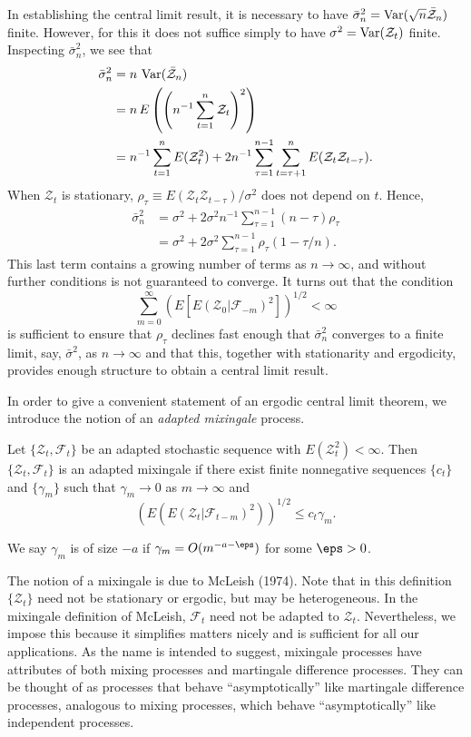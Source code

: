 In establishing the central limit result, it is necessary to have $\bar{\sigma}_n^2 = \operatorname{Var}(\sqrt{n}\bar{\mathcal{Z}}_n)$ finite. However, for this it does not suffice simply to have $\sigma^2 = \operatorname{Var}(\mathcal{Z}_t)$ finite. Inspecting $\bar{\sigma}_n^2$, we see that
\begin{align*}
\bar{\sigma}_n^2 &= n\,\operatorname{Var}(\bar{\mathcal{Z}}_n) \\
&= n\,E\left(\left(n^{-1}\sum_{t=1}^{n}\mathcal{Z}_t\right)^2\right) \\
&= n^{-1}\sum_{t=1}^{n}E(\mathcal{Z}_t^2) + 2n^{-1}\sum_{\tau=1}^{n-1}\sum_{t=\tau+1}^{n}E(\mathcal{Z}_t\mathcal{Z}_{t-\tau}).
\end{align*}
When $\mathcal{Z}_t$ is stationary, $\rho_\tau \equiv E(\mathcal{Z}_t\mathcal{Z}_{t-\tau})/\sigma^2$ does not depend on $t$. Hence,
\begin{align*}
\bar{\sigma}_n^2 &= \sigma^2 + 2\sigma^2 n^{-1}\sum_{\tau=1}^{n-1}(n - \tau)\rho_\tau \\
&= \sigma^2 + 2\sigma^2\sum_{\tau=1}^{n-1}\rho_\tau(1 - \tau/n).
\end{align*}
This last term contains a growing number of terms as $n \to \infty$, and without further conditions is not guaranteed to converge. It turns out that the condition
\[
\sum_{m=0}^{\infty} (E[E(\mathcal{Z}_0|\mathcal{F}_{-m})^2])^{1/2} < \infty
\]
is sufficient to ensure that $\rho_\tau$ declines fast enough that $\bar{\sigma}_n^2$ converges to a finite limit, say, $\bar{\sigma}^2$, as $n \to \infty$ and that this, together with stationarity and ergodicity, provides enough structure to obtain a central limit result.

In order to give a convenient statement of an ergodic central limit theorem, we introduce the notion of an \textit{adapted mixingale} process.

\begin{definition}\label{def:mixingale}
Let $\{\mathcal{Z}_t, \mathcal{F}_t\}$ be an adapted stochastic sequence with $E(\mathcal{Z}_t^2) < \infty$. Then $\{\mathcal{Z}_t, \mathcal{F}_t\}$ is an adapted mixingale if there exist finite nonnegative sequences $\{c_t\}$ and $\{\gamma_m\}$ such that $\gamma_m \to 0$ as $m \to \infty$ and
\[
\left(E\left(E(\mathcal{Z}_t|\mathcal{F}_{t-m})^2\right)\right)^{1/2} \leq c_t \gamma_m.
\]
\end{definition}

We say $\gamma_m$ is of size $-a$ if $\gamma_m = O(m^{-a-\eps})$ for some $\eps > 0$.

The notion of a mixingale is due to McLeish (1974). Note that in this definition $\{\mathcal{Z}_t\}$ need not be stationary or ergodic, but may be heterogeneous. In the mixingale definition of McLeish, $\mathcal{F}_t$ need not be adapted to $\mathcal{Z}_t$. Nevertheless, we impose this because it simplifies matters nicely and is sufficient for all our applications. As the name is intended to suggest, mixingale processes have attributes of both mixing processes and martingale difference processes. They can be thought of as processes that behave ``asymptotically'' like martingale difference processes, analogous to mixing processes, which behave ``asymptotically'' like independent processes.

